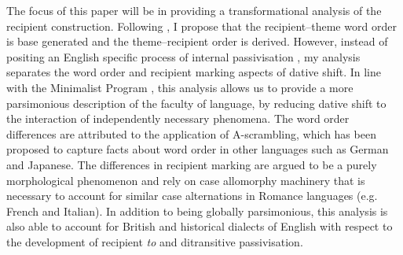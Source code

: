The focus of this paper will be in providing a transformational analysis of the recipient construction. Following \cite{Hallman.2015}, I propose that the recipient--theme word order is base generated and the theme--recipient order is derived. However, instead of positing an English specific process of internal passivisation \citep{Hallman.2015}, my analysis separates the word order and recipient marking aspects of dative shift. In line with the Minimalist Program \citep{Chomsky.1995}, this analysis allows us to provide a more parsimonious description of the faculty of language, by reducing dative shift to the interaction of independently necessary phenomena. The word order differences are attributed to the application of A-scrambling, which has been proposed to capture facts about word order in other languages such as German and Japanese. The differences in recipient marking are argued to be a purely morphological phenomenon and rely on case allomorphy machinery that is necessary to account for similar case alternations in Romance languages (e.g. French and Italian). In addition to being globally parsimonious, this analysis is also able to account for  British and historical dialects of English with respect to the development of recipient \textit{to} and ditransitive passivisation.

